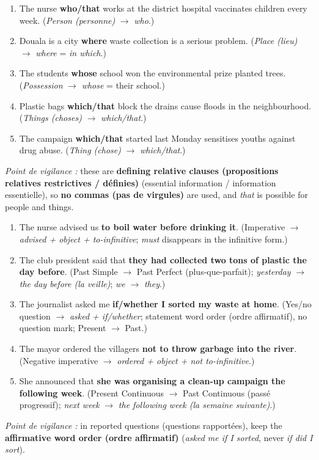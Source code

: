 \documentclass[11pt]{article}
\newcommand{\cle}[1]{{\popxbold\color{popdark}#1}}
\begin{document}
\begin{corrige}
\begin{enumerate}
\item The nurse \textbf{who/that} works at the district hospital vaccinates children every week. (\emph{Person (personne)} $\to$ \emph{who}.)
\item Douala is a city \textbf{where} waste collection is a serious problem. (\emph{Place (lieu)} $\to$ \emph{where} = \emph{in which}.)
\item The students \textbf{whose} school won the environmental prize planted trees. (\emph{Possession} $\to$ \emph{whose} = their school.)
\item Plastic bags \textbf{which/that} block the drains cause floods in the neighbourhood. (\emph{Things (choses)} $\to$ \emph{which/that}.)
\item The campaign \textbf{which/that} started last Monday sensitises youths against drug abuse. (\emph{Thing (chose)} $\to$ \emph{which/that}.)
\end{enumerate}
\emph{Point de vigilance :} these are \textbf{defining relative clauses (propositions relatives restrictives / définies)} (essential information / information essentielle), so \textbf{no commas (pas de virgules)} are used, and \emph{that} is possible for people and things.
\end{corrige}

\begin{corrige}
\begin{enumerate}
\item The nurse advised us \textbf{to boil water before drinking it}. (Imperative $\to$ \emph{advised + object + to-infinitive}; \emph{must} disappears in the infinitive form.)
\item The club president said that \textbf{they had collected two tons of plastic the day before}. (Past Simple $\to$ \cle{Past Perfect (plus-que-parfait)}; \emph{yesterday} $\to$ \emph{the day before (la veille)}; \emph{we} $\to$ \emph{they}.)
\item The journalist asked me \textbf{if/whether I sorted my waste at home}. (Yes/no question $\to$ \emph{asked + if/whether}; \cle{statement word order (ordre affirmatif)}, no question mark; Present $\to$ Past.)
\item The mayor ordered the villagers \textbf{not to throw garbage into the river}. (Negative imperative $\to$ \emph{ordered + object + not to-infinitive}.)
\item She announced that \textbf{she was organising a clean-up campaign the following week}. (Present Continuous $\to$ \cle{Past Continuous (passé progressif)}; \emph{next week} $\to$ \emph{the following week (la semaine suivante)}.)
\end{enumerate}
\emph{Point de vigilance :} in \cle{reported questions (questions rapportées)}, keep the \textbf{affirmative word order (ordre affirmatif)} (\emph{asked me if I sorted}, never \emph{if did I sort}).
\end{corrige}
\end{document}
